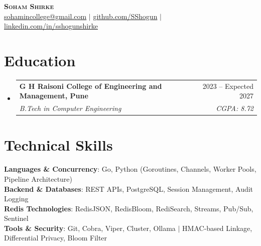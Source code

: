 \documentclass[letterpaper,10pt]{article}
\makeatletter
\newcommand{\resumeSubheading}[4]{
  \vspace{-2pt}\item
    \begin{tabular*}{0.97\textwidth}[t]{l@{\extracolsep{\fill}}r}
      \textbf{#1} & #2 \\
      \textit{\small#3} & \textit{\small #4} \\
    \end{tabular*}\vspace{-7pt}
}
\newcommand{\resumeSubHeadingListStart}{\begin{itemize}[leftmargin=0.15in, label={}]}
\newcommand{\resumeSubHeadingListEnd}{\end{itemize}}
\makeatother
\begin{document}
\begin{center}
    \textbf{\Huge \scshape Soham Shirke} \\ \vspace{1pt}
    \small \href{mailto:sohamincollege@gmail.com}{sohamincollege@gmail.com} $|$ \href{https://github.com/SShogun}{github.com/SShogun} $|$ \href{https://linkedin.com/in/sshogunshirke}{linkedin.com/in/sshogunshirke}
\end{center}

\section{Education}
  \resumeSubHeadingListStart
    \resumeSubheading{G H Raisoni College of Engineering and Management, Pune}{2023 -- Expected 2027}{B.Tech in Computer Engineering}{CGPA: 8.72}
  \resumeSubHeadingListEnd

\section{Technical Skills}
 \begin{itemize}[leftmargin=0.15in, label={}]
    \small{\item{
     \textbf{Languages \& Concurrency}{: Go, Python (Goroutines, Channels, Worker Pools, Pipeline Architecture)} \\
     \textbf{Backend \& Databases}{: REST APIs, PostgreSQL, Session Management, Audit Logging} \\
     \textbf{Redis Technologies}{: RedisJSON, RedisBloom, RediSearch, Streams, Pub/Sub, Sentinel} \\
     \textbf{Tools \& Security}{: Git, Cobra, Viper, Cluster, Ollama $|$ HMAC-based Linkage, Differential Privacy, Bloom Filter}
    }}
 \end{itemize}

\end{document}
